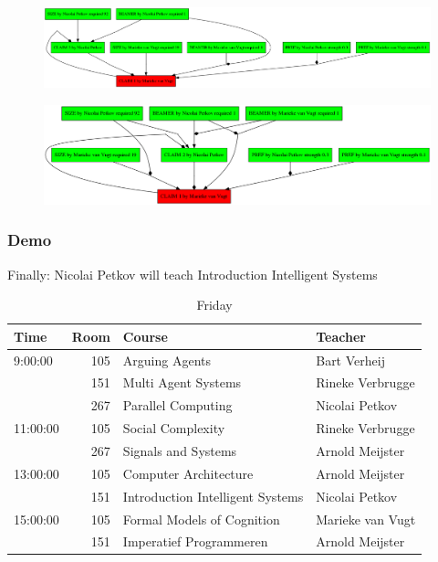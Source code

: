 \documentclass{beamer}
\begin{document}
\begin{frame}[plain]
	\begin{figure}
		\includegraphics[keepaspectratio,width=\textwidth,height=\textheight,]{demo/3}
	\end{figure}
\end{frame}

\begin{frame}[plain]
	\begin{figure}
		\includegraphics[keepaspectratio,width=\textwidth,height=\textheight,]{demo/4}
	\end{figure}
\end{frame}

\begin{frame}
	\frametitle{Demo}
	Finally: Nicolai Petkov will teach Introduction Intelligent Systems
	\fontsize{6}{7.2}\selectfont
	\begin{table}
		\centering
		\caption{Friday}
		\begin{tabular}{l|r|l|l}
			Time & Room & Course & Teacher \\ \hline
			\hline
			9:00:00 & 105 & Arguing Agents & Bart Verheij\\
			& 151 & Multi Agent Systems & Rineke Verbrugge\\
			& 267 & Parallel Computing & Nicolai Petkov\\\hline
			11:00:00 & 105 & Social Complexity & Rineke Verbrugge\\
			& 267 & Signals and Systems & Arnold Meijster\\\hline
			13:00:00 & 105 & Computer Architecture & Arnold Meijster\\
			& 151 & Introduction Intelligent Systems & Nicolai Petkov\\\hline
			15:00:00 & 105 & Formal Models of Cognition & Marieke van Vugt\\
			& 151 & Imperatief Programmeren & Arnold Meijster\\
			\end{tabular}
	\end{table}
\end{frame}
\end{document}
